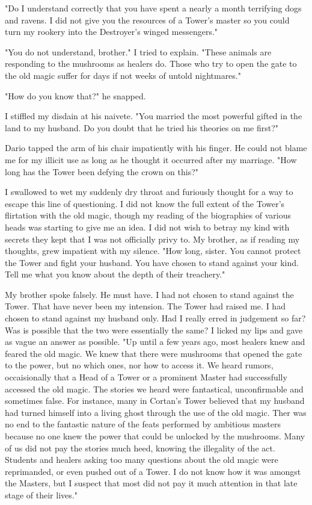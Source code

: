 \documentclass{article}
\begin{document}
"Do I understand correctly that you have spent a nearly a month terrifying dogs and ravens. I did not give you the resources of a Tower's master so you could turn my rookery into the Destroyer's winged messengers."

"You do not understand, brother." I tried to explain. "These animals are responding to the mushrooms as healers do. Those who try to open the gate to the old magic suffer for days if not weeks of untold nightmares."

"How do you know that?" he snapped.

I stiffled my disdain at his naivete. "You married the most powerful gifted in the land to my husband. Do you doubt that he tried his theories on me first?"

Dario tapped the arm of his chair impatiently with his finger. He could not blame me for my illicit use as long as he thought it occurred after my marriage. "How long has the Tower been defying the crown on this?"

I swallowed to wet my suddenly dry throat and furiously thought for a way to escape this line of questioning. I did not know the full extent of the Tower's flirtation with the old magic, though my reading of the biographies of various heads was starting to give me an idea. I did not wish to betray my kind with secrets they kept that I was not officially privy to. My brother, as if reading my thoughts, grew impatient with my silence. "How long, sister. You cannot protect the Tower and fight your husband. You have chosen to stand against your kind. Tell me what you know about the depth of their treachery."

My brother spoke falsely. He must have. I had not chosen to stand against the Tower. That have never been my intension. The Tower had raised me. I had chosen to stand against my husband only. Had I really erred in judgement so far? Was is possible that the two were essentially the same? I licked my lips and gave as vague an answer as possible. "Up until a few years ago, most healers knew and feared the old magic. We knew that there were mushrooms that opened the gate to the power, but no which ones, nor how to access it. We heard rumors, occaisionally that a Head of a Tower or a prominent Master had successfully accessed the old magic. The stories we heard were fantastical, unconfirmable and sometimes false. For instance, many in Cortan's Tower believed that my husband had turned himself into a living ghost through the use of the old magic. Ther was no end to the fantastic nature of the feats performed by ambitious masters because no one knew the power that could be unlocked by the mushrooms. Many of us did not pay the stories much heed, knowing the illegality of the act. Students and healers asking too many questions about the old magic were reprimanded, or even pushed out of a Tower. I do not know how it was amongst the Masters, but I suspect that most did not pay it much attention in that late stage of their lives."
\end{document}
